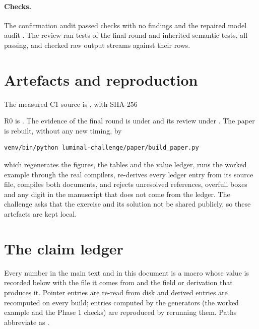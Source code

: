 \documentclass[11pt,a4paper]{article}
\begin{document}
\paragraph{Checks.} The confirmation audit passed  checks with no
findings and the repaired model audit . The review ran  tests of
the final round and  inherited semantic tests, all passing, and checked
 raw output streams against their rows.

\section{Artefacts and reproduction}\label{sec:artefacts}

The measured C1 source is , with SHA-256
\par{}\par\noindent R0 is . The evidence of the
final round is under
 and its review
under . The
paper is rebuilt, without any new timing, by
\begin{verbatim}
venv/bin/python luminal-challenge/paper/build_paper.py
\end{verbatim}
which regenerates the figures, the tables and the value ledger, runs the worked
example through the real compilers, re-derives every ledger entry from its source
file, compiles both documents, and rejects unresolved references, overfull boxes
and any digit in the manuscript that does not come from the ledger. The challenge
asks that the exercise and its solution not be shared publicly, so these artefacts
are kept local.

\section{The claim ledger}\label{sec:ledger}

Every number in the main text and in this document is a macro whose value is
recorded below with the file it comes from and the field or derivation that
produces it. Pointer entries are re-read from disk and derived entries are
recomputed on every build; entries computed by the generators (the worked example
and the Phase 1 checks) are reproduced by rerunning them. Paths abbreviate
 as .
\end{document}
